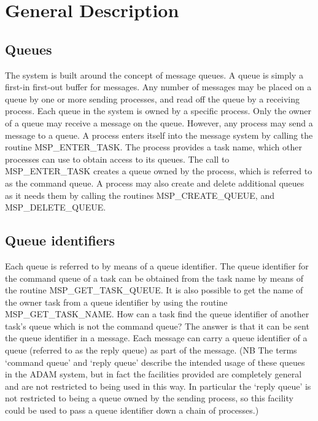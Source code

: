 \section{General Description}

\subsection{Queues}

The system is built around the concept of message queues. A queue is
simply a first-in first-out buffer for messages. Any number of messages may
be placed on a queue by one or more sending processes, and read off the
queue by a receiving process. Each queue in the system is owned by a
specific process. Only the owner of a queue may receive a message on
the queue. However, any process may send a message to a queue. A process enters
itself into the message system by calling the routine MSP\_ENTER\_TASK. The
process provides a task name, which other processes can use to obtain
access to its queues. The call to MSP\_ENTER\_TASK creates a queue owned
by the process, which is referred to as the command queue. A process may
also create and delete additional queues as it needs them by calling
the routines MSP\_CREATE\_QUEUE, and MSP\_DELETE\_QUEUE.

\subsection{Queue identifiers}

Each queue is referred to by means of a queue identifier. The
queue identifier for the command queue of a task can be obtained from
the task name by means of the routine MSP\_GET\_TASK\_QUEUE. It is also
possible to get the name of the owner task from a queue identifier by using
the routine MSP\_GET\_TASK\_NAME. How can a task find the queue identifier
of another task's queue which is not the command queue? The answer is that it
can be sent the queue identifier in a message. Each message can carry a queue
identifier of a queue (referred to as the reply queue) as part of the message.
(NB The terms `command queue' and `reply queue' describe the intended usage
of these queues in the ADAM system, but in fact the facilities provided are
completely general and are not restricted to being used in this way. In
particular the `reply queue' is not restricted to being a queue owned by the
sending process, so this facility could be used to pass a queue identifier
down a chain of processes.)

